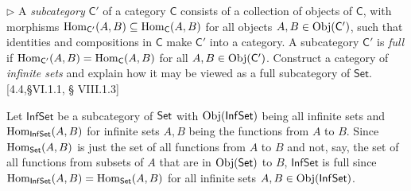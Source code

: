 \begin{problem}[3.8]	
	$\rhd$ A \textit{subcategory} ${\mathsf{C}'}$ of a category $\mathsf{C}$ consists of a
	collection of objects of $\mathsf{C}$, with morphisms
	$\mathrm{Hom}_{\mathsf{C}'}(A,B) \subseteq \mathrm{Hom}_\mathsf{C}(A,B)$ for all objects $A,B\in\mathrm{Obj}({\mathsf{C}'})$, such
	that identities and compositions in $\mathsf{C}$ make ${\mathsf{C}'}$ into a category. A
	subcategory ${\mathsf{C}'}$ is \textit{full} if $\mathrm{Hom}_{\mathsf{C}'}(A,B) = \mathrm{Hom}_\mathsf{C}(A,B)$ for all
	$A,B\in\mathrm{Obj}({\mathsf{C}'})$. Construct a category of \textit{infinite sets} and explain
	how it may be viewed as a full subcategory of $\mathsf{Set}$. [4.4,\S VI.1.1, \S
	VIII.1.3]
\end{problem}
\begin{solution}
	Let ${\mathsf{Inf}\mathsf{Set}}$ be a subcategory of $\mathsf{Set}$ with $\mathrm{Obj}({\mathsf{Inf}\mathsf{Set}})$ being all infinite
	sets and $\mathrm{Hom}_{\mathsf{Inf}\mathsf{Set}}(A,B)$ for infinite sets $A,B$ being the functions from $A$
	to $B$. Since $\mathrm{Hom}_{\mathsf{Set}}(A,B)$ is just the set of all functions from $A$ to $B$
	and not, say, the set of all functions from subsets of $A$ that are in
	$\mathrm{Obj}(\mathsf{Set})$ to $B$, ${\mathsf{Inf}\mathsf{Set}}$ is full since $\mathrm{Hom}_{\mathsf{Inf}\mathsf{Set}}(A,B)=\mathrm{Hom}_{\mathsf{Set}}(A,B)$ for
	all infinite sets $A,B\in\mathrm{Obj}({\mathsf{Inf}\mathsf{Set}})$.
\end{solution}


